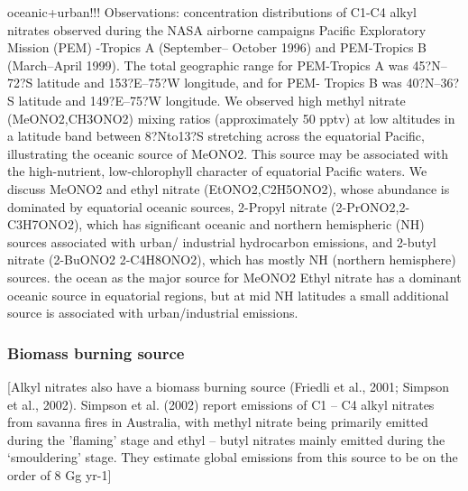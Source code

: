 \documentclass[11pt,a4paper]{article}
\begin{document}
\citep{Blake2003} oceanic+urban!!!
Observations: concentration distributions of C1-C4 alkyl nitrates observed during the NASA airborne campaigns Pacific Exploratory Mission (PEM) -Tropics A (September– October 1996) and PEM-Tropics B (March–April 1999). The total geographic range for PEM-Tropics A was 45?N–72?S latitude and 153?E–75?W longitude, and for PEM- Tropics B was 40?N–36?S latitude and 149?E–75?W longitude. We observed high methyl nitrate (MeONO2,CH3ONO2) mixing ratios (approximately 50 pptv) at low altitudes in a latitude band between 8?Nto13?S stretching across the equatorial Pacific, illustrating the oceanic source of MeONO2. This source may be associated with the high-nutrient, low-chlorophyll character of equatorial Pacific waters. We discuss MeONO2 and ethyl nitrate (EtONO2,C2H5ONO2), whose abundance is dominated by equatorial oceanic sources, 2-Propyl nitrate (2-PrONO2,2-C3H7ONO2), which has significant oceanic and northern hemispheric (NH) sources associated with urban/ industrial hydrocarbon emissions, and 2-butyl nitrate (2-BuONO2 2-C4H8ONO2), which has mostly NH (northern hemisphere) sources.
the ocean as the major source for MeONO2
Ethyl nitrate has a dominant oceanic source in equatorial regions, but at mid NH latitudes a small additional source is associated with urban/industrial emissions.

\subsubsection*{Biomass burning source}
\citep{Newland2013}
[Alkyl nitrates also have a biomass burning source (Friedli et al., 2001; Simpson et al., 2002). Simpson et al. (2002) report emissions of C1 – C4 alkyl nitrates from savanna fires in Australia, with methyl nitrate being primarily emitted during the ’flaming’ stage and ethyl – butyl nitrates mainly emitted during the ‘smouldering’ stage. They estimate global emissions from this source to be on the order of 8 Gg yr-1]
\end{document}
